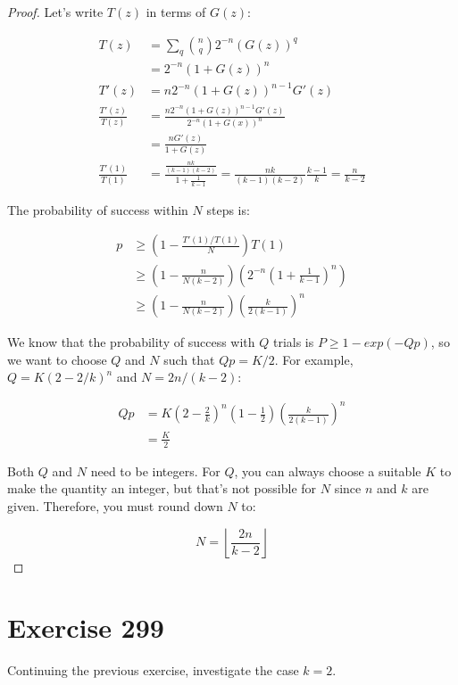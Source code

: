 \documentclass[10pt]{book}
\begin{document}
\begin{proof}
  Let's write $T(z)$ in terms of $G(z)$:

  \begin{align*}
    T(z) &= \sum_q {n\choose q}2^{-n}\left(G(z)\right)^q \\
         &= 2^{-n}\left(1+G(z)\right)^n \\
    T'(z) &= n2^{-n} \left(1+G(z)\right)^{n-1}G'(z) \\
    \frac{T'(z)}{T(z)} 
      &= \frac{n2^{-n} \left(1+G(z)\right)^{n-1}G'(z)}
         {2^{-n} \left(1+G(x)\right)^n} \\
      &= \frac{nG'(z)}{1+G(z)} \\
    \frac{T'(1)}{T(1)} 
    &= \frac{\frac{nk}{(k-1)(k-2)}}{1+\frac{1}{k-1}}
     =\frac{nk}{(k-1)(k-2)}\frac{k-1}{k}
     =\frac{n}{k-2}
  \end{align*}

  The probability of success within $N$ steps is:

  \begin{align*}
    p &\ge \left(1-\frac{T'(1)/T(1)}{N}\right)T(1) \\
      &\ge \left(1-\frac{n}{N(k-2)}\right)\left(2^{-n}\left(1+\frac{1}{k-1}\right)^n\right) \\
      &\ge \left(1-\frac{n}{N(k-2)}\right)\left(\frac{k}{2(k-1)}\right)^n
  \end{align*}

  We know that the probability of success with $Q$ trials is $P\ge 1-exp(-Qp)$, so we want to choose $Q$ and $N$ such that $Qp=K/2$. For example, $Q=K(2-2/k)^n$ and $N=2n/(k-2)$:

  \begin{align*}
    Qp &= K\left(2-\frac{2}{k}\right)^n\left(1-\frac{1}{2}\right)
      \left(\frac{k}{2(k-1)}\right)^n\\
      &= \frac{K}{2}
  \end{align*}

  Both $Q$ and $N$ need to be integers. For $Q$, you can always choose a suitable $K$ to make the quantity an integer, but that's not possible for $N$ since $n$ and $k$ are given. Therefore, you must round down $N$ to:

  $$N=\left\lfloor\frac{2n}{k-2}\right\rfloor$$

\end{proof}
\section{Exercise 299}

Continuing the previous exercise, investigate the case $k=2$.
\end{document}
